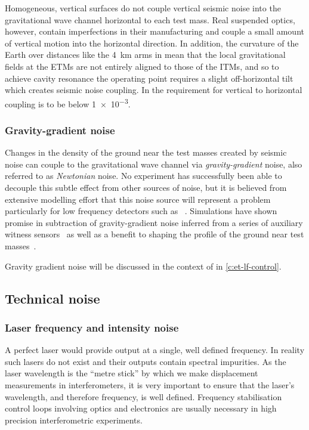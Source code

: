Homogeneous, vertical surfaces do not couple vertical seismic noise into the gravitational wave channel horizontal to each test mass. Real suspended optics, however, contain imperfections in their manufacturing and couple a small amount of vertical motion into the horizontal direction. In addition, the curvature of the Earth over distances like the \SI{4}{\kilo\meter} arms in \ALIGO{} mean that the local gravitational fields at the \glspl{ETM} are not entirely aligned to those of the \glspl{ITM}, and so to achieve cavity resonance the operating point requires a slight off-horizontal tilt which creates seismic noise coupling. In \ALIGO{} the requirement for vertical to horizontal coupling is to be below \num{1e-3}.

\subsubsection{\label{sec:gravity-gradient-noise}Gravity-gradient noise}
Changes in the density of the ground near the test masses created by seismic noise can couple to the gravitational wave channel via \emph{gravity-gradient} noise, also referred to as \emph{Newtonian} noise. No experiment has successfully been able to decouple this subtle effect from other sources of noise, but it is believed from extensive modelling effort that this noise source will represent a problem particularly for low frequency detectors such as \ETLF{}~\cite{ET2011, Hild2011}. Simulations have shown promise in subtraction of gravity-gradient noise inferred from a series of auxiliary witness sensors~\cite{Harms2015} as well as a benefit to shaping the profile of the ground near test masses~\cite{Harms2014}.

Gravity gradient noise will be discussed in the context of \ETLF{} in \cref{c:et-lf-control}.

\subsection{Technical noise}

\subsubsection{\label{sec:laser-noise}Laser frequency and intensity noise}
A perfect laser would provide output at a single, well defined frequency. In reality such lasers do not exist and their outputs contain spectral impurities. As the laser wavelength is the ``metre stick'' by which we make displacement measurements in interferometers, it is very important to ensure that the laser's wavelength, and therefore frequency, is well defined. Frequency stabilisation control loops involving optics and electronics are usually necessary in high precision interferometric experiments.


